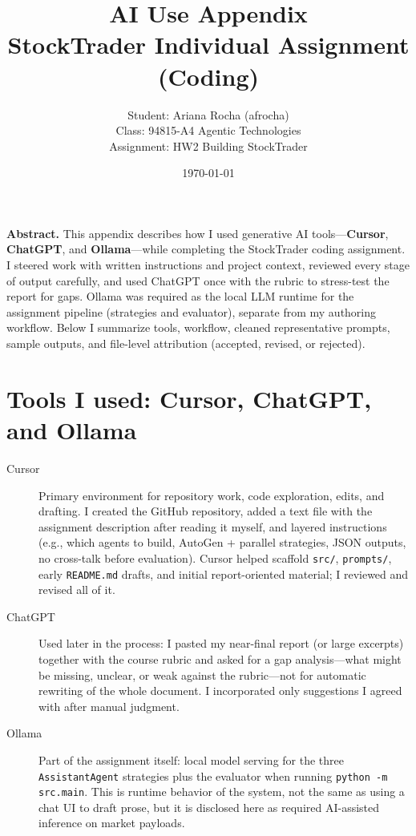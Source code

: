 \documentclass[11pt]{article}
\title{AI Use Appendix\\StockTrader Individual Assignment (Coding)}
\author{%
  Student: Ariana Rocha (afrocha)\\
  Class: 94815-A4 Agentic Technologies \\
  Assignment: HW2 Building StockTrader \\
}
\date{\today}
\begin{document}
\maketitle

\noindent\textbf{Abstract.}
This appendix describes how I used generative AI tools---\textbf{Cursor}, \textbf{ChatGPT}, and \textbf{Ollama}---while completing the StockTrader coding assignment. I steered work with written instructions and project context, reviewed every stage of output carefully, and used ChatGPT once with the rubric to stress-test the report for gaps. Ollama was required as the local LLM runtime for the assignment pipeline (strategies and evaluator), separate from my authoring workflow. Below I summarize tools, workflow, cleaned representative prompts, sample outputs, and file-level attribution (accepted, revised, or rejected).

\section{Tools I used: Cursor, ChatGPT, and Ollama}

\begin{description}
  \item[Cursor] Primary environment for repository work, code exploration, edits, and drafting. I created the GitHub repository, added a text file with the assignment description after reading it myself, and layered instructions (e.g., which agents to build, AutoGen + parallel strategies, JSON outputs, no cross-talk before evaluation). Cursor helped scaffold \texttt{src/}, \texttt{prompts/}, early \texttt{README.md} drafts, and initial report-oriented material; I reviewed and revised all of it.
  \item[ChatGPT] Used later in the process: I pasted my near-final report (or large excerpts) together with the course rubric and asked for a gap analysis---what might be missing, unclear, or weak against the rubric---not for automatic rewriting of the whole document. I incorporated only suggestions I agreed with after manual judgment.
  \item[Ollama] Part of the assignment itself: local model serving for the three \texttt{AssistantAgent} strategies plus the evaluator when running \texttt{python -m src.main}. This is runtime behavior of the system, not the same as using a chat UI to draft prose, but it is disclosed here as required AI-assisted inference on market payloads.
\end{description}
\end{document}
